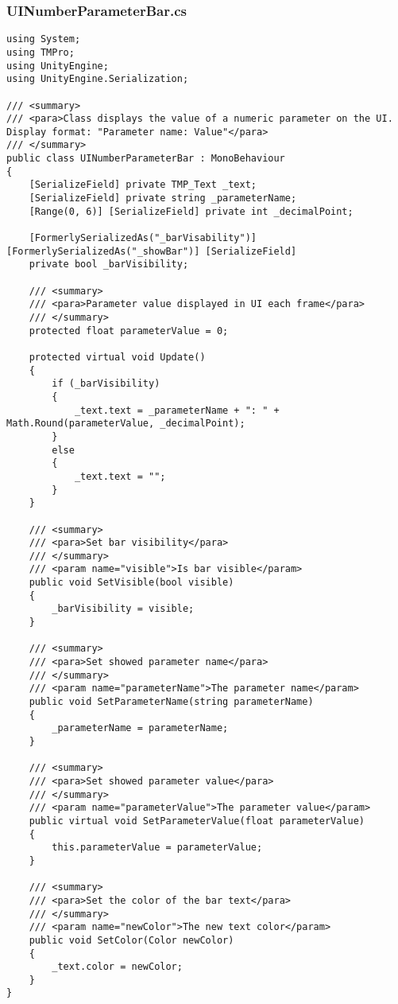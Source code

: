 \subsubsection*{UINumberParameterBar.cs}
\begin{verbatim}
using System;
using TMPro;
using UnityEngine;
using UnityEngine.Serialization;

/// <summary>
/// <para>Class displays the value of a numeric parameter on the UI. Display format: "Parameter name: Value"</para>
/// </summary>
public class UINumberParameterBar : MonoBehaviour
{
    [SerializeField] private TMP_Text _text;
    [SerializeField] private string _parameterName;
    [Range(0, 6)] [SerializeField] private int _decimalPoint;

    [FormerlySerializedAs("_barVisability")] [FormerlySerializedAs("_showBar")] [SerializeField]
    private bool _barVisibility;

    /// <summary>
    /// <para>Parameter value displayed in UI each frame</para>
    /// </summary>
    protected float parameterValue = 0;

    protected virtual void Update()
    {
        if (_barVisibility)
        {
            _text.text = _parameterName + ": " + Math.Round(parameterValue, _decimalPoint);
        }
        else
        {
            _text.text = "";
        }
    }

    /// <summary>
    /// <para>Set bar visibility</para>
    /// </summary>
    /// <param name="visible">Is bar visible</param>
    public void SetVisible(bool visible)
    {
        _barVisibility = visible;
    }

    /// <summary>
    /// <para>Set showed parameter name</para>
    /// </summary>
    /// <param name="parameterName">The parameter name</param>
    public void SetParameterName(string parameterName)
    {
        _parameterName = parameterName;
    }

    /// <summary>
    /// <para>Set showed parameter value</para>
    /// </summary>
    /// <param name="parameterValue">The parameter value</param>
    public virtual void SetParameterValue(float parameterValue)
    {
        this.parameterValue = parameterValue;
    }

    /// <summary>
    /// <para>Set the color of the bar text</para>
    /// </summary>
    /// <param name="newColor">The new text color</param>
    public void SetColor(Color newColor)
    {
        _text.color = newColor;
    }
}
\end{verbatim}
